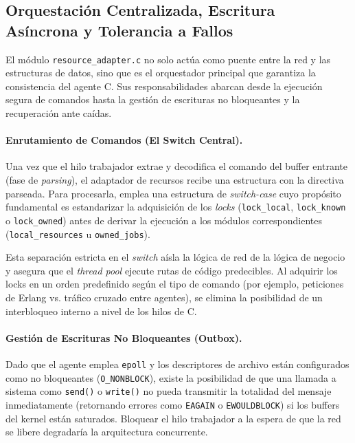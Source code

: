 \documentclass[12pt,a4paper]{article}
\begin{document}
\subsection{Orquestación Centralizada, Escritura Asíncrona y Tolerancia a Fallos}

El módulo \texttt{resource\_adapter.c} no solo actúa como puente entre la red y las estructuras de datos, sino que es el orquestador principal que garantiza la consistencia del agente C. Sus responsabilidades abarcan desde la ejecución segura de comandos hasta la gestión de escrituras no bloqueantes y la recuperación ante caídas.

\paragraph{Enrutamiento de Comandos (El Switch Central).}
Una vez que el hilo trabajador extrae y decodifica el comando del buffer entrante (fase de \emph{parsing}), el adaptador de recursos recibe una estructura con la directiva parseada. Para procesarla, emplea una estructura de \emph{switch-case} cuyo propósito fundamental es estandarizar la adquisición de los \emph{locks} (\texttt{lock\_local}, \texttt{lock\_known} o \texttt{lock\_owned}) antes de derivar la ejecución a los módulos correspondientes (\texttt{local\_resources} u \texttt{owned\_jobs}). 

Esta separación estricta en el \emph{switch} aísla la lógica de red de la lógica de negocio y asegura que el \emph{thread pool} ejecute rutas de código predecibles. Al adquirir los locks en un orden predefinido según el tipo de comando (por ejemplo, peticiones de Erlang vs. tráfico cruzado entre agentes), se elimina la posibilidad de un interbloqueo interno a nivel de los hilos de C.

\paragraph{Gestión de Escrituras No Bloqueantes (Outbox).}
Dado que el agente emplea \texttt{epoll} y los descriptores de archivo están configurados como no bloqueantes (\texttt{O\_NONBLOCK}), existe la posibilidad de que una llamada a sistema como \texttt{send()} o \texttt{write()} no pueda transmitir la totalidad del mensaje inmediatamente (retornando errores como \texttt{EAGAIN} o \texttt{EWOULDBLOCK}) si los buffers del kernel están saturados. Bloquear el hilo trabajador a la espera de que la red se libere degradaría la arquitectura concurrente.
\end{document}
